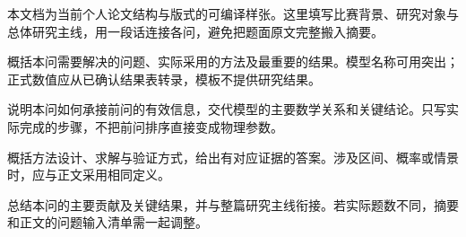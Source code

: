 本文档为当前个人论文结构与版式的可编译样张。这里填写比赛背景、研究对象与总体研究主线，用一段话连接各问，避免把题面原文完整搬入摘要。

概括本问需要解决的问题、实际采用的方法及最重要的结果。模型名称可用突出；正式数值应从已确认结果表转录，模板不提供研究结果。

说明本问如何承接前问的有效信息，交代模型的主要数学关系和关键结论。只写实际完成的步骤，不把前问排序直接变成物理参数。

概括方法设计、求解与验证方式，给出有对应证据的答案。涉及区间、概率或情景时，应与正文采用相同定义。

总结本问的主要贡献及关键结果，并与整篇研究主线衔接。若实际题数不同，摘要和正文的问题输入清单需一起调整。

